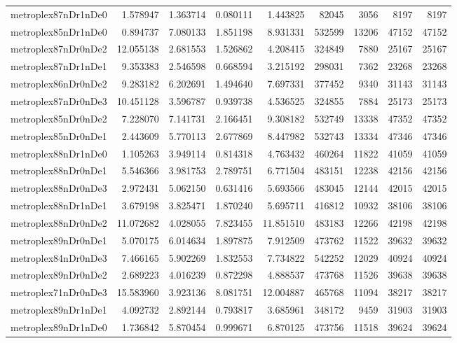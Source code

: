 \begin{longtable}{|l|r|r|r|r|r|r|r|r|}
metroplex87nDr1nDe0 & 1.578947 & 1.363714 & 0.080111 & 1.443825 & 82045 & 3056 & 8197 & 8197 \\
metroplex85nDr1nDe0 & 0.894737 & 7.080133 & 1.851198 & 8.931331 & 532599 & 13206 & 47152 & 47152 \\
metroplex87nDr0nDe2 & 12.055138 & 2.681553 & 1.526862 & 4.208415 & 324849 & 7880 & 25167 & 25167 \\
metroplex87nDr1nDe1 & 9.353383 & 2.546598 & 0.668594 & 3.215192 & 298031 & 7362 & 23268 & 23268 \\
metroplex86nDr0nDe2 & 9.283182 & 6.202691 & 1.494640 & 7.697331 & 377452 & 9340 & 31143 & 31143 \\
metroplex87nDr0nDe3 & 10.451128 & 3.596787 & 0.939738 & 4.536525 & 324855 & 7884 & 25173 & 25173 \\
metroplex85nDr0nDe2 & 7.228070 & 7.141731 & 2.166451 & 9.308182 & 532749 & 13338 & 47352 & 47352 \\
metroplex85nDr0nDe1 & 2.443609 & 5.770113 & 2.677869 & 8.447982 & 532743 & 13334 & 47346 & 47346 \\
metroplex88nDr1nDe0 & 1.105263 & 3.949114 & 0.814318 & 4.763432 & 460264 & 11822 & 41059 & 41059 \\
metroplex88nDr0nDe1 & 5.546366 & 3.981753 & 2.789751 & 6.771504 & 483151 & 12238 & 42156 & 42156 \\
metroplex88nDr0nDe3 & 2.972431 & 5.062150 & 0.631416 & 5.693566 & 483045 & 12144 & 42015 & 42015 \\
metroplex88nDr1nDe1 & 3.679198 & 3.825471 & 1.870240 & 5.695711 & 416812 & 10932 & 38106 & 38106 \\
metroplex88nDr0nDe2 & 11.072682 & 4.028055 & 7.823455 & 11.851510 & 483183 & 12266 & 42198 & 42198 \\
metroplex89nDr0nDe1 & 5.070175 & 6.014634 & 1.897875 & 7.912509 & 473762 & 11522 & 39632 & 39632 \\
metroplex84nDr0nDe3 & 7.466165 & 5.902269 & 1.832553 & 7.734822 & 542252 & 12029 & 40924 & 40924 \\
metroplex89nDr0nDe2 & 2.689223 & 4.016239 & 0.872298 & 4.888537 & 473768 & 11526 & 39638 & 39638 \\
metroplex71nDr0nDe3 & 15.583960 & 3.923136 & 8.081751 & 12.004887 & 465768 & 11094 & 38217 & 38217 \\
metroplex89nDr1nDe1 & 4.092732 & 2.892144 & 0.793817 & 3.685961 & 348172 & 9459 & 31903 & 31903 \\
metroplex89nDr1nDe0 & 1.736842 & 5.870454 & 0.999671 & 6.870125 & 473756 & 11518 & 39624 & 39624 \\

\end{longtable}
